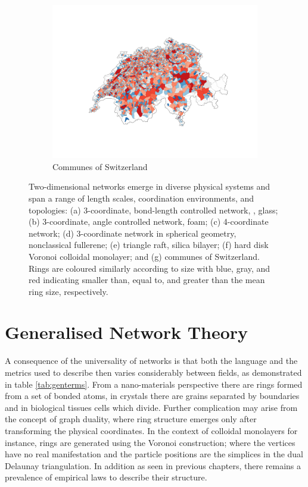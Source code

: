 \begin{figure}[bt]
     \vspace{0.2cm}
     \begin{subfigure}[b]{0.5\textwidth}
         \centering
         \includegraphics[width=\textwidth]{./figures/general_networks/ch_lowres.pdf}
         \caption{Communes of Switzerland}
         \label{fig:ne7}
     \end{subfigure}

     \caption{Two-dimensional networks emerge in diverse physical systems and span a range of length scales, coordination environments,
and topologies: (a) 3-coordinate, bond\--length controlled network, \eg, glass; (b) 3\--coordinate, angle controlled network, \eg{} foam; (c) 4\--coordinate network; (d) 3\--coordinate network in spherical geometry, \eg{} nonclassical fullerene; (e) triangle raft, \eg{} silica bilayer; (f) hard disk Voronoi \eg{} colloidal monolayer; and (g) communes of Switzerland. Rings are coloured similarly according to size with blue, gray, and red indicating smaller than, equal to, and greater than the mean ring size, respectively.}
     \label{fig:networkexamples}
\end{figure}

\section{Generalised Network Theory}

A consequence of the universality of \td{} networks is that both the language and the metrics used to describe then varies considerably between fields, as demonstrated in table \ref{tab:genterms}.
From a nano\--materials perspective there are rings formed from a set of bonded atoms, in crystals there are grains separated by boundaries and in biological tissues cells which divide.
Further complication may arise from the concept of graph duality, where ring structure emerges only after transforming the physical coordinates.
In the context of colloidal monolayers for instance, rings are generated using the Voronoi construction; where the vertices have no real manifestation and the particle positions are the simplices in the dual Delaunay triangulation.
In addition as seen in previous chapters, there remains a prevalence of empirical laws to describe their structure.

